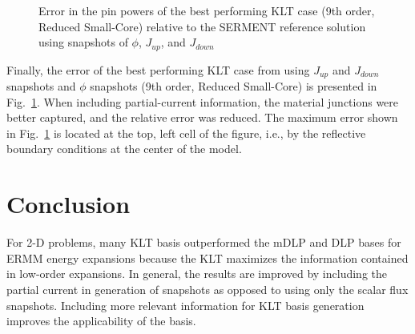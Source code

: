 \documentclass[5p,times,twocolumn,10pt]{elsarticle}
\newcommand{\FIG}[1]{Fig.~\ref{#1}}               %
\begin{document}
\begin{figure}[htb]
\caption{Error in the pin powers of the best performing KLT case (9th 
order, Reduced Small-Core) relative to the SERMENT 
reference solution using snapshots of $\phi$, $J_{up}$, and $J_{down}$}
\label{fig:serkltpartial}
\end{figure}

Finally, the error of the best performing KLT case from using $J_{up}$ and $J_{down}$ snapshots 
and $\phi$ snapshots (9th order, Reduced Small-Core) is presented in 
\FIG{fig:serkltpartial}.  When including partial-current information, the material
junctions were better captured, and the relative error was reduced.  The maximum error shown in 
\FIG{fig:serkltpartial} is located at the top, left cell of the figure, i.e., by the reflective boundary 
conditions at the center of the
model.

\section{Conclusion}

For 2-D problems, many KLT basis outperformed the mDLP and DLP bases for ERMM 
energy expansions because the KLT maximizes the information contained in 
low-order expansions.  In general, the results are 
improved by including the partial current in generation of snapshots as 
opposed to using only the scalar flux snapshots.  Including more relevant information
for KLT basis generation improves the applicability of the basis.
\end{document}
